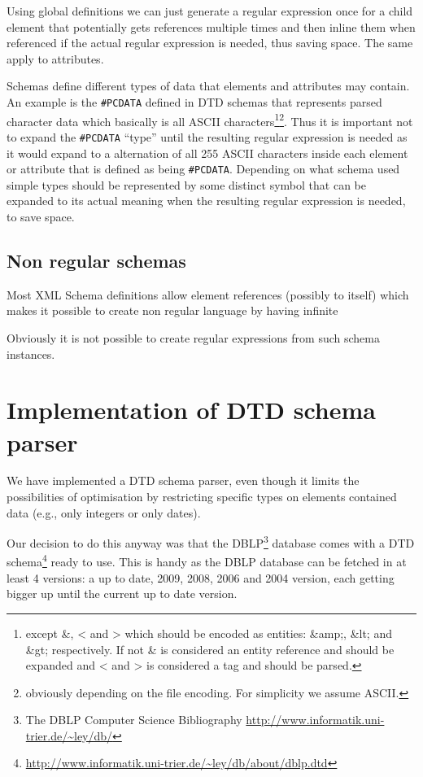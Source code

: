 \documentclass[a4paper, oneside]{memoir}
\theoremstyle{definition}
\begin{document}
Using global definitions we can just generate a regular expression once for a
child element that potentially gets references multiple times and then inline
them when referenced if the actual regular expression is needed, thus saving
space. The same apply to attributes.
\label{sec:global-definitions-save-space}


Schemas define different types of data that elements and attributes may
contain. An example is the \texttt{\#PCDATA} defined in DTD schemas that
represents parsed character data which basically is all ASCII
characters\footnote{except \&, < and > which should be encoded as entities:
  \&amp;, \&lt; and \&gt; respectively. If not \& is considered an entity
  reference and should be expanded and < and > is considered a tag and should be
  parsed.}\footnote{obviously depending on the file encoding. For simplicity we
  assume ASCII.}. Thus it is important not to expand the \texttt{\#PCDATA}
``type'' until the resulting regular expression is needed as it would expand to
a alternation of all 255 ASCII characters inside each element or attribute that
is defined as being \texttt{\#PCDATA}. Depending on what schema used simple
types should be represented by some distinct symbol that can be expanded to its
actual meaning when the resulting regular expression is needed, to save space.

\subsection{ Non regular schemas}

Most XML Schema definitions allow element references (possibly to itself) which
makes it possible to create non regular language by having infinite

Obviously it is not possible to create regular expressions from such schema
instances.

\section{Implementation of DTD schema parser}

We have implemented a DTD schema parser, even though it limits the possibilities
of optimisation by restricting specific types on elements contained data (e.g.,
only integers or only dates).

Our decision to do this anyway was that the DBLP\footnote{The DBLP Computer
  Science Bibliography \url{http://www.informatik.uni-trier.de/~ley/db/}}
database comes with a DTD
schema\footnote{\url{http://www.informatik.uni-trier.de/~ley/db/about/dblp.dtd}}
ready to use. This is handy as the DBLP database can be fetched in at least 4
versions: a up to date, 2009, 2008, 2006 and 2004 version, each getting bigger
up until the current up to date version.
\end{document}
